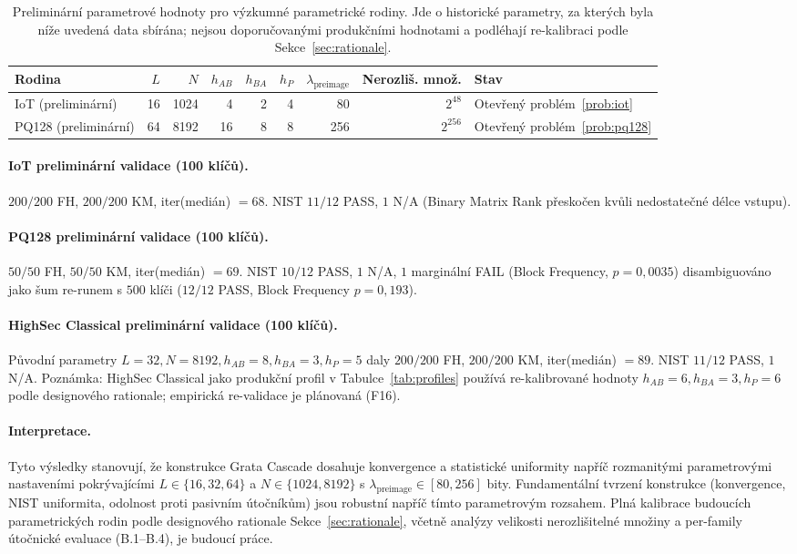 \documentclass[11pt,a4paper]{article}
\begin{document}
\begin{table}[ht]
\centering
\small
\begin{tabular}{lrrrrrrrl}
\toprule
Rodina & $L$ & $N$ & $h_{AB}$ & $h_{BA}$ & $h_P$ & $\lambda_\text{preimage}$ & Nerozliš. množ. & Stav \\
\midrule
IoT (preliminární) & 16 & 1024 & 4 & 2 & 4 & 80 & $2^{48}$ & Otevřený problém~\ref{prob:iot} \\
PQ128 (preliminární) & 64 & 8192 & 16 & 8 & 8 & 256 & $2^{256}$ & Otevřený problém~\ref{prob:pq128} \\
\bottomrule
\end{tabular}
\caption{Preliminární parametrové hodnoty pro výzkumné parametrické rodiny. Jde o historické parametry, za kterých byla níže uvedená data sbírána; nejsou doporučovanými produkčními hodnotami a podléhají re-kalibraci podle Sekce~\ref{sec:rationale}.}
\label{tab:profiles-baseline}
\end{table}

\paragraph{IoT preliminární validace (100 klíčů).}
$200/200$ FH, $200/200$ KM, iter(medián) $= 68$. NIST $11/12$ PASS, $1$ N/A (Binary Matrix Rank přeskočen kvůli nedostatečné délce vstupu).

\paragraph{PQ128 preliminární validace (100 klíčů).}
$50/50$ FH, $50/50$ KM, iter(medián) $= 69$. NIST $10/12$ PASS, $1$ N/A, $1$ marginální FAIL (Block Frequency, $p = 0{,}0035$) disambiguováno jako šum re-runem s $500$ klíči ($12/12$ PASS, Block Frequency $p = 0{,}193$).

\paragraph{HighSec Classical preliminární validace (100 klíčů).}
Původní parametry $L = 32, N = 8192, h_{AB} = 8, h_{BA} = 3, h_P = 5$ daly $200/200$ FH, $200/200$ KM, iter(medián) $= 89$. NIST $11/12$ PASS, $1$ N/A. Poznámka: HighSec Classical jako produkční profil v Tabulce~\ref{tab:profiles} používá re-kalibrované hodnoty $h_{AB} = 6, h_{BA} = 3, h_P = 6$ podle designového rationale; empirická re-validace je plánovaná (F16).

\paragraph{Interpretace.} Tyto výsledky stanovují, že konstrukce Grata Cascade dosahuje konvergence a statistické uniformity napříč rozmanitými parametrovými nastaveními pokrývajícími $L \in \{16, 32, 64\}$ a $N \in \{1024, 8192\}$ s $\lambda_\text{preimage} \in [80, 256]$ bity. Fundamentální tvrzení konstrukce (konvergence, NIST uniformita, odolnost proti pasivním útočníkům) jsou robustní napříč tímto parametrovým rozsahem. Plná kalibrace budoucích parametrických rodin podle designového rationale Sekce~\ref{sec:rationale}, včetně analýzy velikosti nerozlišitelné množiny a per-family útočnické evaluace (B.1--B.4), je budoucí práce.
\end{document}
